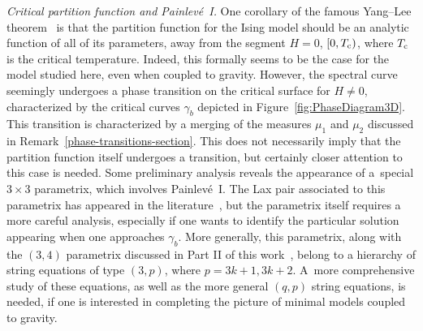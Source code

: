 \documentclass[pdftex]{sigma}
\numberwithin{equation}{section}
\begin{document}
\textit{Critical partition function and Painlev\'{e}~I.} One corollary of the famous Yang--Lee theorem~\mbox{\cite{YangLee2, YangLee1}} is that
the partition function for the Ising model should be an analytic function of all of its parameters, away from the segment $H=0$, $[0,T_{\rm c})$,
where $T_{\rm c}$ is the critical temperature. Indeed, this formally seems to be the case for the model studied here, even when coupled
to gravity. However, the spectral curve seemingly undergoes a phase transition on the critical surface for $H\neq 0$, characterized by
the critical curves $\gamma_b$ depicted in Figure~\ref{fig:PhaseDiagram3D}. This transition is characterized by a merging of the
measures $\mu_1$ and $\mu_2$ discussed in Remark~\ref{phase-transitions-section}. This does not necessarily imply that the partition
function itself undergoes a transition, but certainly closer attention to this case is needed. Some preliminary analysis reveals the
appearance of a~special $3\times 3$ parametrix, which involves Painlev\'{e}~I. The Lax pair associated to this parametrix has
appeared in the literature~\cite{JKT}, but the parametrix itself requires a more careful analysis, especially if one wants to identify
the particular solution appearing when one approaches $\gamma_b$. More generally, this parametrix, along with the $(3,4)$ parametrix
discussed in Part II of this work~\cite{DHL2}, belong to a hierarchy of string equations of type $(3,p)$, where $p = 3k+1, 3k+2$. A~more comprehensive study of these equations, as well as the more general $(q,p)$ string equations, is needed, if one is interested in completing the picture of minimal models coupled to gravity.
\end{document}
